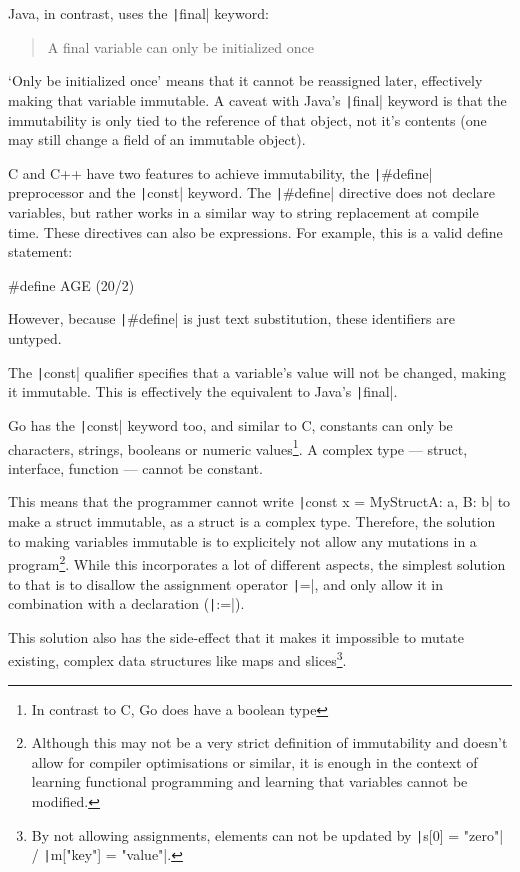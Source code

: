 Java, in contrast, uses the \texttt|final| keyword:
\begin{quote}
    A final variable can only be initialized once\autocite{final-java}
\end{quote}
`Only be initialized once' means that it cannot be reassigned later, effectively
making that variable immutable.
A caveat with Java's \texttt|final| keyword is that the immutability
is only tied to the reference of that object, not
it's contents (one may still change a field of an immutable object).

C and C++ have two features to achieve immutability, the \texttt|#define|
preprocessor and the \texttt|const| keyword.
The \texttt|#define| directive does not declare variables, but rather
works in a similar way to string replacement at compile time. These directives
can also be expressions. For example, this is a valid define statement:
\begin{ccode}
#define AGE (20/2)
\end{ccode}

However, because \texttt|#define| is just text substitution, these
identifiers are untyped.

The \texttt|const| qualifier specifies that a variable's value
will not be changed, making it immutable. This is effectively the equivalent
to Java's \texttt|final|.

Go has the \texttt|const| keyword too, and similar to C, constants can only be
characters, strings, booleans or numeric values\footnote{In contrast to C, Go does
have a boolean type}. A complex type --- struct, interface, function --- cannot be constant.

This means that the programmer cannot write
\texttt|const x = MyStruct{A: a, B: b}| to make a struct immutable,
as a struct is a complex type. Therefore, the solution to making variables
immutable is to explicitely not allow any mutations in a program\footnote{
    Although this may not be a very strict definition of immutability and doesn't
    allow for compiler optimisations or similar, it is enough in the context of
learning functional programming and learning that variables cannot be modified.}.
While this incorporates a lot of different aspects, the simplest solution
to that is to disallow the assignment operator \texttt|=|, and only
allow it in combination with a declaration (\texttt|:=|).

This solution also has the side-effect that it makes it impossible to mutate
existing, complex data structures like maps and slices\footnote{By not
    allowing assignments, elements can not be updated by
\texttt|s[0] = "zero"| / \texttt|m["key"] = "value"|.}.

